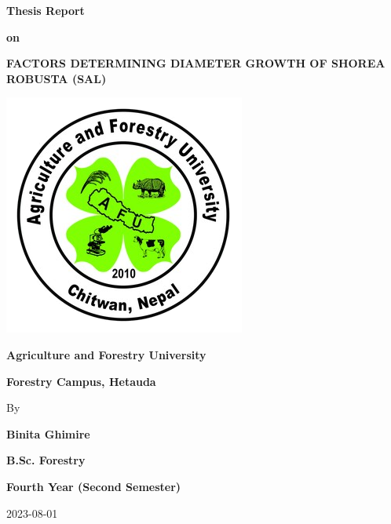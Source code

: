 \documentclass[
]{article}
\author{}
\date{\vspace{-2.5em}}
\begin{document}
\allsectionsfont{\raggedright}
\subsectionfont{\raggedright}
\subsubsectionfont{\raggedright}

\vspace{0cm}


\begin{centering}

\Large

\doublespacing

\bf Thesis Report

\bf on

\bf FACTORS DETERMINING DIAMETER GROWTH OF SHOREA ROBUSTA (SAL)



\begin{center}\includegraphics[width=0.5\linewidth]{AFU_logo} \end{center}


\normalsize

\Large

\bf Agriculture and Forestry University


\bf Forestry Campus, Hetauda

\vspace{1cm}

\normalsize

\singlespacing

By

\vspace{0.5 cm}

\Large

\bf Binita Ghimire

\Large

\bf B.Sc. Forestry

\bf Fourth Year (Second Semester)

\vspace{1cm}

\normalsize

2023-08-01

\end{centering}
\end{document}
